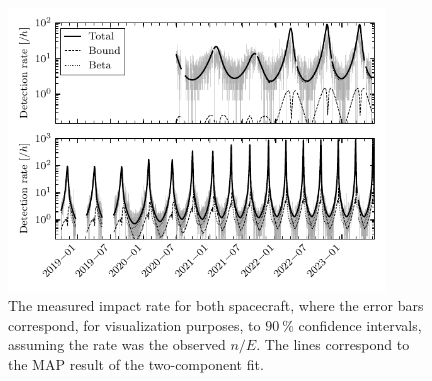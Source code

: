\begin{figure}[t]
 	\centering
 	\includegraphics[width=10cm]{figures/both_shield_rate_log.pdf}
 	\caption{The measured impact rate for both spacecraft, where the error bars correspond, for visualization purposes, to $\SI{90}{\%}$ confidence intervals, assuming the rate was the observed $n/E$. The lines correspond to the MAP result of the two-component fit.}
 	\label{fig:fit_rate}
\end{figure}







